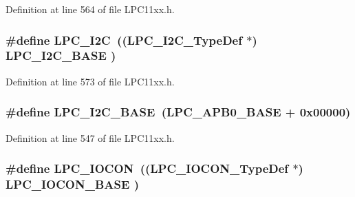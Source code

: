 Definition at line 564 of file L\+P\+C11xx.\+h.

\subsubsection[{\texorpdfstring{L\+P\+C\+\_\+\+I2C}{LPC_I2C}}]{\setlength{\rightskip}{0pt plus 5cm}\#define L\+P\+C\+\_\+\+I2C~(({\bf L\+P\+C\+\_\+\+I2\+C\+\_\+\+Type\+Def}    $\ast$) {\bf L\+P\+C\+\_\+\+I2\+C\+\_\+\+B\+A\+SE}   )}\hypertarget{group___l_p_c11xx___definitions_ga70a2faf2e119737f0e660984564d4907}{}\label{group___l_p_c11xx___definitions_ga70a2faf2e119737f0e660984564d4907}


Definition at line 573 of file L\+P\+C11xx.\+h.

\subsubsection[{\texorpdfstring{L\+P\+C\+\_\+\+I2\+C\+\_\+\+B\+A\+SE}{LPC_I2C_BASE}}]{\setlength{\rightskip}{0pt plus 5cm}\#define L\+P\+C\+\_\+\+I2\+C\+\_\+\+B\+A\+SE~({\bf L\+P\+C\+\_\+\+A\+P\+B0\+\_\+\+B\+A\+SE} + 0x00000)}\hypertarget{group___l_p_c11xx___definitions_ga9e53652929424015ade23fe30e1d022b}{}\label{group___l_p_c11xx___definitions_ga9e53652929424015ade23fe30e1d022b}


Definition at line 547 of file L\+P\+C11xx.\+h.

\subsubsection[{\texorpdfstring{L\+P\+C\+\_\+\+I\+O\+C\+ON}{LPC_IOCON}}]{\setlength{\rightskip}{0pt plus 5cm}\#define L\+P\+C\+\_\+\+I\+O\+C\+ON~(({\bf L\+P\+C\+\_\+\+I\+O\+C\+O\+N\+\_\+\+Type\+Def}  $\ast$) {\bf L\+P\+C\+\_\+\+I\+O\+C\+O\+N\+\_\+\+B\+A\+SE} )}\hypertarget{group___l_p_c11xx___definitions_gaabc651799ba17b0dd4a0114c8d48a145}{}\label{group___l_p_c11xx___definitions_gaabc651799ba17b0dd4a0114c8d48a145}


